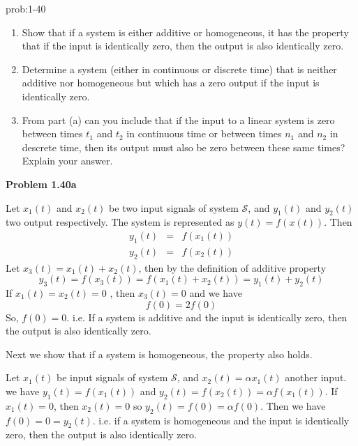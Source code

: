 \documentclass[koma,a4paper,utopia,12pt,listings-color,microtype,paralist,colorlinks,urlcolor=red]{org-article}
\begin{document}
\begin{prob}[]{prob:1-40}
\begin{enumerate}
\item Show that if a system is either additive or homogeneous, it has the
property that if the input is identically zero, then the output is also
identically zero.
\item Determine a system (either in continuous or discrete time) that is
neither additive nor homogeneous but which has a zero output if the input
is identically zero.
\item From part (a) can you include that if the input to a linear system is
zero  between times \(t_{1}\) and \(t_{2}\) in continuous time or between
times \(n_{1}\) and \(n_{2}\) in descrete time, then its output must also
be zero between these same times? Explain your answer.
\end{enumerate}
\label{prob:1-40}
\end{prob}

\textbf{Problem 1.40a}

\begin{prf}[]{}
Let \(x_{1}(t)\) and \(x_{2}(t)\) be two input signals of system
\(\mathcal{S}\), and \(y_{1}(t)\) and \(y_{2}(t)\) two output respectively. The
system is represented as \(y(t) = f(x(t))\). Then
\begin{eqnarray*}
y_{1}(t)&=& f(x_{1}(t)) \\
y_{2}(t)&=& f(x_{2}(t))
\end{eqnarray*}
Let \(x_{3}(t)= x_{1}(t) + x_{2}(t)\), then by the definition of additive
property
\begin{equation*}
y_{3}(t) = f(x_{3}(t)) = f(x_{1}(t) + x_{2}(t)) = y_{1}(t) + y_{2}(t)
\end{equation*}
If \(x_{1}(t)= x_{2}(t) = 0\) , then \(x_{3}(t) = 0\) and we have
\begin{equation*}
f(0) = 2f(0)
\end{equation*}
So, \(f(0) = 0\). i.e. If a system is additive and the input is identically
zero, then the output is also identically zero.

Next we show that if a system is homogeneous, the property also holds.

Let \(x_{1}(t)\) be input signals of system \(\mathcal{S}\), and \(x_{2}(t)= \alpha
x_{1}(t)\) another input. we have
\(y_{1}(t) = f(x_{1}(t))\) and \(y_{2}(t) = f(x_{2}(t)) = \alpha f(x_{1}(t))\).
If \(x_{1}(t)  = 0\), then \(x_{2}(t) = 0\) so \(y_{2}(t) = f(0) = \alpha
f(0)\). Then we have \(f(0) = 0 = y_{2}(t)\). i.e. if a system is homogeneous
and the input is identically zero, then the output is also identically zero.
\end{prf}
\end{document}

